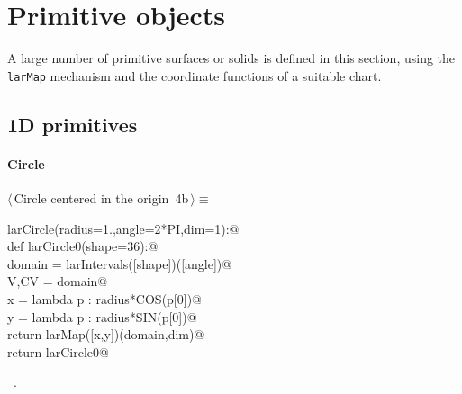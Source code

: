 \documentclass[11pt,oneside]{article}	%
\begin{document}
\section{Primitive objects}
\label{sec:generators}

A large number of primitive surfaces or solids is defined in this section, using the \texttt{larMap} mechanism and the coordinate functions of a suitable chart.

\subsection{1D primitives}

\paragraph{Circle}
\begin{flushleft} \small \label{scrap5}
\protect{}$\langle\,$Circle centered in the origin\nobreak\ {\footnotesize 4b}$\,\rangle\equiv$
\vspace{-1ex}
\begin{list}{}{} \item
\mbox{}\verb@def larCircle(radius=1.,angle=2*PI,dim=1):@\\
\mbox{}\verb@   def larCircle0(shape=36):@\\
\mbox{}\verb@      domain = larIntervals([shape])([angle])@\\
\mbox{}\verb@      V,CV = domain@\\
\mbox{}\verb@      x = lambda p : radius*COS(p[0])@\\
\mbox{}\verb@      y = lambda p : radius*SIN(p[0])@\\
\mbox{}\verb@      return larMap([x,y])(domain,dim)@\\
\mbox{}\verb@   return larCircle0@\\
\mbox{}\verb@@{\NWsep}
\end{list}
\vspace{-1ex}
\footnotesize\addtolength{\baselineskip}{-1ex}
\begin{list}{}{\setlength{\itemsep}{-\parsep}\setlength{\itemindent}{-\leftmargin}}
\item \NWtxtMacroRefIn\ .
\end{list}
\end{flushleft}
\end{document}

